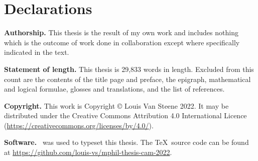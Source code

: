 \section*{Declarations}

\textbf{Authorship.} This thesis is the result of my own work and includes nothing which is the outcome of work done in collaboration except where specifically indicated in the text.

\vspace{1cm}\noindent
\textbf{Statement of length.} This thesis is 29,833 words in length. Excluded from this count are the contents of the title page and preface, the epigraph, mathematical and logical formulae, glosses and translations, and the list of references.

\vspace{1cm}\noindent
\textbf{Copyright.} This work is Copyright © Louis Van Steene 2022. It may be distributed under the Creative Commons Attribution 4.0 International Licence (\url{https://creativecommons.org/licenses/by/4.0/}).

\vspace{1cm}\noindent
\textbf{Software.} \XeLaTeX\ was used to typeset this thesis. The \TeX\ source code can be found at \mbox{\url{https://github.com/louis-vs/mphil-thesis-cam-2022}.}
